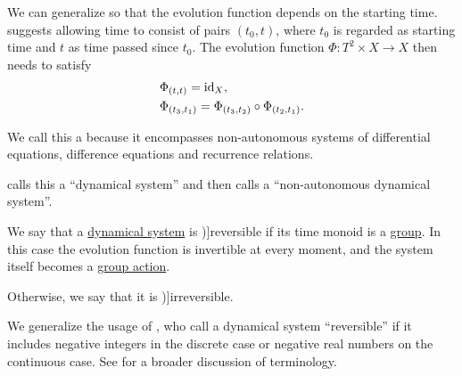 \begin{definition}\label{def:non_autonomous_dynamical_system}\mimprovised
  We can generalize  so that the evolution function depends on the starting time.  suggests allowing time to consist of pairs \( (t_0, t) \), where \( t_0 \) is regarded as starting time and \( t \) as time passed since \( t_0 \). The evolution function \( \Phi: T^2 \times X \to X \) then needs to satisfy
  \begin{align}
    &\Phi_{(t, t)} = \id_X,                                            \label{eq:def:non_autonomous_dynamical_system/identity} \\
    &\Phi_{(t_3, t_1)} = \Phi_{(t_3, t_2)} \bincirc \Phi_{(t_2, t_1)}. \label{eq:def:non_autonomous_dynamical_system/compatibility}
  \end{align}

  We call this a  because it encompasses non-autonomous systems of differential equations, difference equations and recurrence relations.
\end{definition}
\begin{comments}
  \item {} calls this a \enquote{dynamical system} and then calls  a \enquote{non-autonomous dynamical system}.
\end{comments}

\begin{definition}\label{def:reversible_dynamical_system}\mimprovised
  We say that a \hyperref[def:dynamical_system]{dynamical system} is \term[en=reversible (\cite[1]{HasselblattKatok1995DynamicalSystems})]{reversible} if its time monoid is a \hyperref[def:group]{group}. In this case the evolution function is invertible at every moment, and the system itself becomes a \hyperref[def:group_action]{group action}.

  Otherwise, we say that it is \term[en=irreversible (\cite[1]{HasselblattKatok1995DynamicalSystems})]{irreversible}.
\end{definition}
\begin{comments}
  \item We generalize the usage of , who call a dynamical system \enquote{reversible} if it includes negative integers in the discrete case or negative real numbers on the continuous case. See  for a broader discussion of terminology.
\end{comments}

